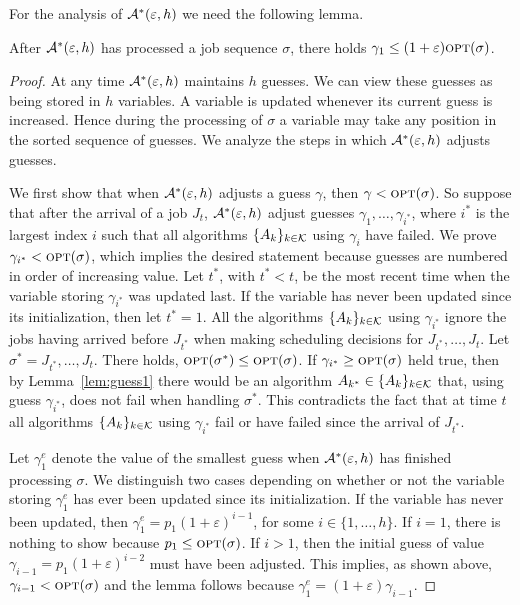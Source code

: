 \documentclass{llncs}
\newcommand{\OPT}{\text{{\sc opt}}}
\newcommand{\opt}{\OPT}
\newcommand{\eps}{\varepsilon}
\begin{document}
For the analysis of ${\cal A^*}(\eps,h)$ we need the following lemma. 

\begin{lemma}\label{lem:guess2}
After ${\cal A^*}(\eps,h)$ has processed a job sequence $\sigma$, there holds $\gamma_1\leq (1+\eps)\opt(\sigma)$.
\end{lemma}
\begin{proof}
At any time ${\cal A^*}(\eps,h)$ maintains $h$ guesses. We can view these guesses as being
stored in $h$ variables. A variable is updated whenever its current guess is increased. Hence
during the processing of $\sigma$ a variable may take any position in the sorted sequence of
guesses. We analyze the steps in which ${\cal A^*}(\eps,h)$ adjusts guesses.

We first show that when ${\cal A^*}(\eps,h)$ adjusts a guess $\gamma$, then $\gamma < \opt(\sigma)$. So
suppose that after the arrival of a job $J_t$, ${\cal A^*}(\eps,h)$ adjust guesses $\gamma_1, \ldots,
\gamma_{i^*}$, where $i^*$ is the largest index $i$ such that all algorithms $\{A_k\}_{k\in {\cal K}}$ 
using $\gamma_i$ have failed. We prove $\gamma_{i^*} < \opt(\sigma)$, which implies the desired statement
because guesses are numbered in order of increasing value. Let $t^*$, with $t^* <t$, be the most recent time when 
the variable storing $\gamma_{i^*}$ was updated last. If the variable has never been updated since its
initialization, then let $t^*=1$. All the algorithms $\{A_k\}_{k\in {\cal K}}$ using $\gamma_{i^*}$ ignore
the jobs having arrived before $J_{t^*}$ when making scheduling decisions for $J_{t^*}, \ldots, J_t$. 
Let $\sigma^* = J_{t^*}, \ldots, J_t$. There holds, $\opt(\sigma^*) \leq \opt(\sigma)$. 
If $\gamma_{i^*} \geq \opt(\sigma)$ held true, then by Lemma~\ref{lem:guess1} there would be an algorithm 
$A_{k^*}\in \{A_k\}_{k\in {\cal K}}$ that, using guess $\gamma_{i^*}$, does not fail when handling $\sigma^*$.
This contradicts the fact that at time $t$ all algorithms $\{A_k\}_{k\in {\cal K}}$ using
$\gamma_{i^*}$ fail or have failed since the arrival of $J_{t^*}$. 

Let $\gamma_1^e$ denote the value of the smallest guess when ${\cal A^*}(\eps,h)$  has finished processing
$\sigma$. We distinguish two cases depending on whether or not the variable storing $\gamma_1^e$ has
ever been updated since its initialization. If the variable has never been updated, then
$\gamma_1^e= p_1(1+\eps)^{i-1}$, for some $i\in \{1,\ldots, h\}$. If $i=1$, there is nothing to show
because $p_1\leq \opt(\sigma)$. If $i>1$, then the initial guess of value $\gamma_{i-1} = p_1(1+\eps)^{i-2}$
must have been adjusted. This implies, as shown above, $\gamma_{i-1} < \opt(\sigma)$ and the lemma follows 
because $\gamma_1^e = (1+\eps) \gamma_{i-1}$. 


\end{proof}
\end{document}
